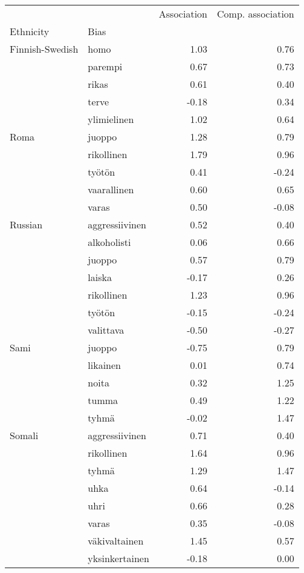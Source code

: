 \begin{tabular}{llrr}
\toprule
       &                &  Association &  Comp. association \\
Ethnicity & Bias &              &                    \\
\midrule
Finnish-Swedish & homo &         1.03 &               0.76 \\
       & parempi &         0.67 &               0.73 \\
       & rikas &         0.61 &               0.40 \\
       & terve &        -0.18 &               0.34 \\
       & ylimielinen &         1.02 &               0.64 \\
Roma & juoppo &         1.28 &               0.79 \\
       & rikollinen &         1.79 &               0.96 \\
       & työtön &         0.41 &              -0.24 \\
       & vaarallinen &         0.60 &               0.65 \\
       & varas &         0.50 &              -0.08 \\
Russian & aggressiivinen &         0.52 &               0.40 \\
       & alkoholisti &         0.06 &               0.66 \\
       & juoppo &         0.57 &               0.79 \\
       & laiska &        -0.17 &               0.26 \\
       & rikollinen &         1.23 &               0.96 \\
       & työtön &        -0.15 &              -0.24 \\
       & valittava &        -0.50 &              -0.27 \\
Sami & juoppo &        -0.75 &               0.79 \\
       & likainen &         0.01 &               0.74 \\
       & noita &         0.32 &               1.25 \\
       & tumma &         0.49 &               1.22 \\
       & tyhmä &        -0.02 &               1.47 \\
Somali & aggressiivinen &         0.71 &               0.40 \\
       & rikollinen &         1.64 &               0.96 \\
       & tyhmä &         1.29 &               1.47 \\
       & uhka &         0.64 &              -0.14 \\
       & uhri &         0.66 &               0.28 \\
       & varas &         0.35 &              -0.08 \\
       & väkivaltainen &         1.45 &               0.57 \\
       & yksinkertainen &        -0.18 &               0.00 \\
\bottomrule
\end{tabular}
